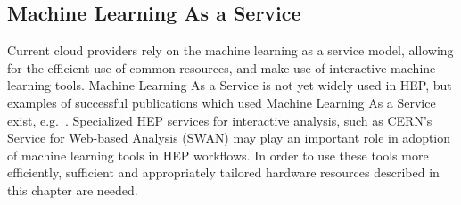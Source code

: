 \subsection{Machine Learning As a Service}
Current cloud providers rely on the machine learning as a service model, allowing for the efficient use of common resources, and make use of interactive machine learning tools. Machine Learning As a Service is not yet widely used in HEP, but examples of successful publications which used Machine Learning As a Service exist, e.g.~\cite{Aaij:2014azz}. Specialized HEP services for interactive analysis, such as CERN's Service for Web-based Analysis (SWAN) may play an important role in adoption of machine learning tools in HEP workflows. In order to use these tools more efficiently, sufficient and appropriately tailored hardware resources  described in this chapter are needed.



